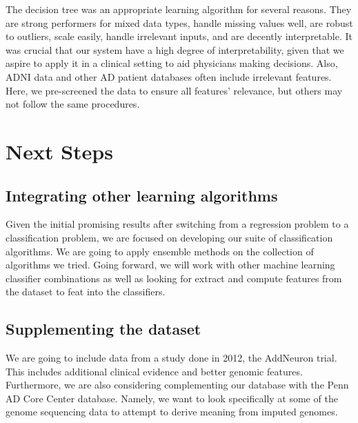 \documentclass{article}
\begin{document}
The decision tree was an appropriate learning algorithm for several reasons. They are strong performers for mixed data types, handle missing values well, are robust to outliers, scale easily, handle irrelevant inputs, and are decently interpretable.  It was crucial that our system have a high degree of interpretability, given that we aspire to apply it in a clinical setting to aid physicians making decisions. Also, ADNI data and other AD patient databases often include irrelevant features. Here, we pre-screened the data to ensure all features' relevance, but others may not follow the same procedures.


\section{Next Steps}
\subsection{Integrating other learning algorithms}
Given the initial promising results after switching from a regression problem to a classification problem, we are focused on developing our suite of classification algorithms. We are going to apply ensemble methods on the collection of algorithms we tried. Going forward, we will work with other machine learning classifier combinations as well as looking for extract and compute features from the dataset to feat into the classifiers.
\subsection{Supplementing the dataset}
We are going to include data from a study done in 2012, the AddNeuron trial. This includes additional clinical evidence and better genomic features. Furthermore, we are also considering complementing our database with the Penn AD Core Center database. Namely, we want to look specifically at some of the genome sequencing data to attempt to derive meaning from imputed genomes.
\end{document}
